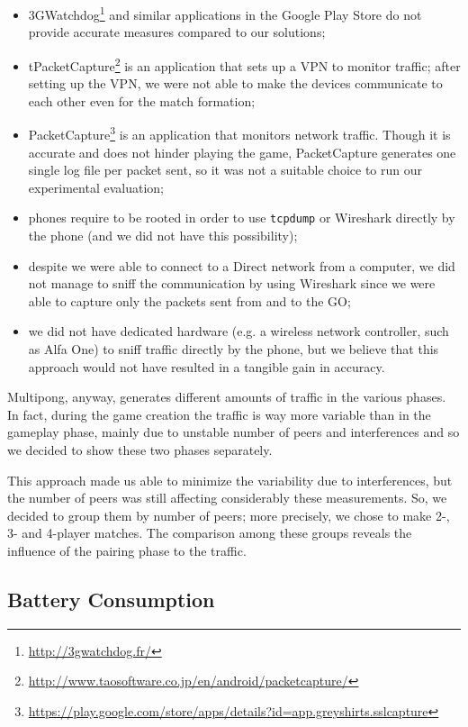 \begin{itemize}
  \item 3GWatchdog\footnote{\url{http://3gwatchdog.fr/}} and similar
    applications in the Google Play Store do not provide accurate measures
    compared to our solutions;
  \item tPacketCapture\footnote{\url{http://www.taosoftware.co.jp/en/android/packetcapture/}}
    is an application that sets up a VPN to monitor traffic; after setting up
    the VPN, we were not able to make the devices communicate to each other
    even for the match formation;
  \item PacketCapture\footnote{\url{https://play.google.com/store/apps/details?id=app.greyshirts.sslcapture}}
    is an application that monitors network traffic. Though it is accurate and
    does not hinder playing the game, PacketCapture generates one single log
    file per packet sent, so it was not a suitable choice to run our
    experimental evaluation;
  \item phones require to be rooted in order to use \texttt{tcpdump} or
    Wireshark directly by the phone (and we did not have this possibility);
  \item despite we were able to connect to a \wifi{} Direct network from a
    computer, we did not manage to sniff the communication by using Wireshark
    since we were able to capture only the packets sent from and to the GO;
  \item we did not have dedicated hardware (e.g. a wireless network controller, 
    such as Alfa One) to sniff traffic directly by the phone, but we believe 
    that this approach would not have resulted in a tangible gain in accuracy.
\end{itemize}

Multipong, anyway, generates different amounts of traffic in the various
phases. In fact, during the game creation the traffic is way more variable than
in the gameplay phase, mainly due to unstable number of peers and \wifi{}
interferences and so we decided to show these two phases separately.

This approach made us able to minimize the variability due to interferences, 
but the number of peers was still affecting considerably these measurements. 
So, we decided to group them by number of peers; more precisely, we chose to 
make 2-, 3- and 4-player matches. The comparison among these groups reveals 
the influence of the pairing phase to the traffic.

\subsection{Battery Consumption}

